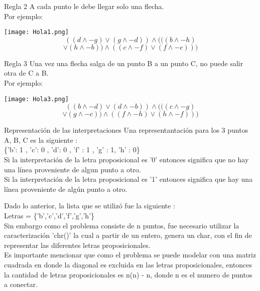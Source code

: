 \documentclass{beamer}
\begin{document}
\begin{frame}{Regla 2}
A cada punto le debe llegar solo una flecha. \\[10 pt] 
Por ejemplo:
\begin{multicols}{2}
\center \texttt{[image: Hola1.png]}
\\[30 pt] \justify $$((d \wedge -g) \lor (g \wedge -d))\wedge(((b \wedge -h) $$ 
$$ \lor (h \wedge -b)) \wedge ((c \wedge -f) \lor (f \wedge -c))) $$
\end{multicols}
\end{frame}

\begin{frame}{Regla 3}
Una vez una flecha salga de un punto B a un punto C, no puede salir otra de C a B. \\[10 pt]
Por ejemplo:
\begin{multicols}{2}
\center \texttt{[image: Hola3.png]}
\\[30 pt] \justify $$((b \wedge -d) \lor (d \wedge -b))\wedge(((c \wedge -g) $$ 
$$ \lor (g \wedge -c)) \wedge ((f \wedge -h) \lor (h \wedge -f))) $$
\end{multicols}
\end{frame}

\begin{frame}{Representación de las interpretaciones}
Una representantación para los 3 puntos A, B, C es la siguiente : 
\\[20 pt]
\center \{'b': 1 , 'c': 0 , 'd': 0 , 'f' : 1 , 'g' : 1,  'h' : 0\}\\[20 pt]

\justify Si la interpretación de la letra proposicional es  '0' entonces significa que no hay una línea proveniente de algun punto a otro.\\[10 pt]
\justify Si la interpretación de la letra proposicional es  '1' entonces significa que hay una línea proveniente de algún punto a otro.
\end{frame}

\begin{frame}{}
Dado lo anterior, la lista que se utilizó fue la siguiente : 
\\[20 pt]

\center Letras = \{'b','c','d','f','g','h'\}
\\[20 pt]

\justify Sin embargo como el problema consiste de n puntos, fue necesario utilizar la caracterización 'chr()' la cual a partir de un entero, genera un char, con el fin de representar las diferentes letras proposicionales.\\[10 pt]

\justify Es importante mencionar que como el problema se puede modelar con una matriz cuadrada en donde la diagonal es excluida en las letras proposicionales, entonces la cantidad de letras proposicionales es n(n) - n, donde n es el numero de puntos a conectar.\\[10 pt]

\end{frame}
\end{document}
